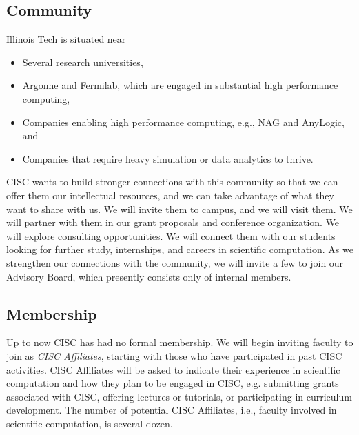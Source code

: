 \documentclass[12pt]{amsart}
\begin{document}
\subsection*{Community} Illinois Tech is situated near 
\begin{itemize}
    \item Several research universities,
    
    \item Argonne and Fermilab, which are engaged in substantial high performance computing,
    
    \item Companies enabling high performance computing, e.g., NAG and AnyLogic,  and
    
    \item Companies that require heavy simulation or data analytics to thrive.
\end{itemize}
CISC wants to build stronger connections with this community so that we can offer them our intellectual resources, and we can take advantage of what they want to share with us.  We will invite them to campus, and we will visit them.  We will partner with them in our grant proposals and conference organization.  We will explore consulting opportunities.  We will connect them with our students looking for further study, internships, and careers in scientific computation.
As we strengthen our connections with the community, we will invite a few to join our Advisory Board, which presently consists only of internal members.

\subsection*{Membership} 
Up to now CISC has had no formal membership.  We will begin inviting faculty to join as \emph{CISC Affiliates}, starting with those who have participated in past CISC activities.  CISC Affiliates will be asked to indicate their experience in scientific computation and how they plan to be engaged in CISC, e.g. submitting grants associated with CISC, offering lectures or tutorials, or participating in curriculum development. The number of potential CISC Affiliates, i.e., faculty involved in scientific computation, is several dozen.  
\end{document}
